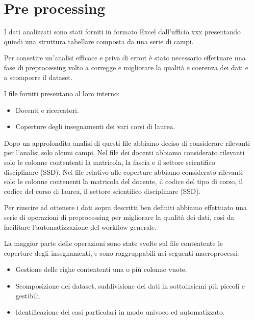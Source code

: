 \section{Pre processing}
\label{sec:pre-proc}


I dati analizzati sono stati forniti in formato Excel dall'ufficio xxx
presentando quindi una struttura tabellare composta da una serie di campi.

Per consetire un'analisi efficace e priva di errori è stato necessario effettuare una fase di
preprocessing volto a corregge e migliorare la qualità e coerenza dei dati e a scomporre il dataset.

I file forniti presentano al loro interno:
\begin{itemize}
    \item Docenti e ricercatori.
    \item Coperture degli insegnamenti dei vari corsi di laurea.
\end{itemize}

Dopo un approfondita analisi di questi file abbiamo deciso di considerare rilevanti per l'analisi solo alcuni campi.
Nel file dei docenti abbiamo considerato rilevanti solo le colonne contententi la matricola, la fascia e
il settore scientifico disciplinare (SSD).
Nel file relativo alle coperture abbiamo considerato rilevanti solo le colonne contenenti
la matricola del docente, il codice del tipo di corso, il codice del corso di laurea, il settore scientifico disciplinare (SSD).

Per riuscire ad ottenere i dati sopra descritti ben definiti abbiamo effettuato una serie di operazioni di preprocessing per migliorare la qualità dei
dati, così da facilitare l'automatizzazione del workflow generale.

La maggior parte delle operazioni sono state svolte sul file contentente le coperture degli insegnamenti, e sono raggruppabili nei seguenti macroprocessi:
\begin{itemize}
    \item Gestione delle righe contententi una o più colonne vuote.
    \item Scomposizione dei dataset, suddivisione dei dati in sottoinsiemi più piccoli e gestibili.
    \item Identificazione dei casi particolari in modo univoco ed automatizzato.
\end{itemize}

